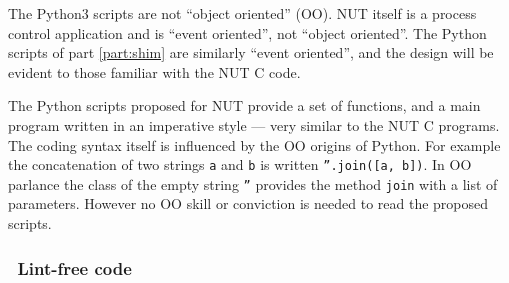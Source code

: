 \documentclass[12pt]{article}
\newlength{\headersep}\setlength{\headersep}{3mm}
\newcommand{\Hsep}{\hspace{\headersep}}
\begin{document}
The Python3 scripts are not ``object oriented'' (OO).  NUT itself is a
process control application and is ``event oriented'', not ``object
oriented''.  The Python scripts of part \ref{part:shim} are similarly
``event oriented'', and the design will be evident to those familiar
with the NUT C code.

The Python scripts proposed for NUT provide a set of functions, and a main
program written in an imperative style --- very similar to the NUT C programs.
The coding syntax itself is influenced by the OO origins of Python.  For
example the concatenation of two strings \texttt{a} and \texttt{b} is written
\texttt{''.join([a, b])}.  In OO parlance the class of the empty string
\texttt{''} provides the method \texttt{join} with a list of parameters.
However no OO skill or conviction is needed to read the proposed scripts.

\subsubsection{\Hsep\ Lint-free code}\label{section:lint}
\end{document}

